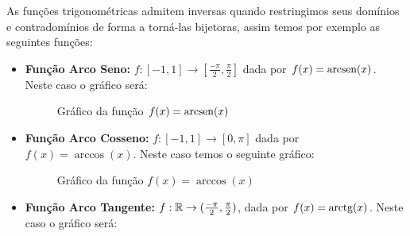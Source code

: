  As funções trigonométricas admitem inversas quando restringimos seus domínios e contradomínios de forma a torná-las bijetoras, assim temos por exemplo as seguintes funções:

\begin{itemize}
  \item \textbf{Função Arco Seno:} $f: [-1, 1] \rightarrow [\frac{-\pi}{2}, \frac{\pi}{2}]$ dada por $f(x)= \operatorname{arcsen}(x)$. Neste caso o gráfico será:

  \begin{figure}[H]
  \centering
    \caption{Gráfico da função $f(x)= \operatorname{arcsen}(x)$}
  \end{figure}


  \item \textbf{Função Arco Cosseno:} $f: [-1, 1] \rightarrow [0, \pi]$ dada por $f(x)= \arccos(x)$. Neste caso temos o seguinte gráfico:

  \begin{figure}[H]
  \centering
    \caption{Gráfico da função $f(x)= \arccos(x)$}
  \end{figure}


  \item \textbf{Função Arco Tangente:} $f: \mathbb{R} \rightarrow (\frac{-\pi}{2}, \frac{\pi}{2})$, dada por $f(x)= \operatorname{arctg}(x)$. Neste caso o gráfico será:


\end{itemize}
